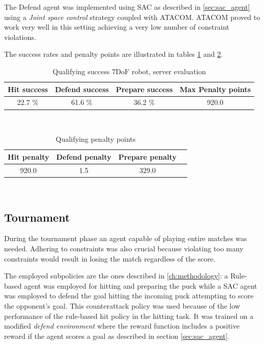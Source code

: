 The Defend agent was implemented using SAC as described in \ref{sec:sac_agent} using a \textit{Joint space control} strategy coupled with ATACOM. ATACOM proved
to work very well in this setting achieving a very low number of constraint violations.

The success rates and penalty points are illustrated in tables \ref{table:qualifying_success} and \ref{table:qualifying_penalties}.

\begin{table}[H]
    \centering 
    \begin{tabular}{|c | c | c | c |}
    \hline
     \textbf{Hit success} & \textbf{Defend success} & \textbf{Prepare success} & \textbf{Max Penalty points} \T\B \\
    \hline \hline
    22.7 \% & 61.6 \% & 36.2 \% & 920.0 \T\B \\
    \hline
    \end{tabular}
    \\[10pt]
    \caption{Qualifying success 7DoF robot, server evaluation}
    \label{table:qualifying_success}
\end{table}

\begin{table}[H]
    \centering 
    \begin{tabular}{|c | c | c | c |}
    \hline
     \textbf{Hit penalty} & \textbf{Defend penalty} & \textbf{Prepare penalty} \T\B \\
    \hline \hline
    920.0 & 1.5 & 329.0 \T\B \\
    \hline
    \end{tabular}
    \\[10pt]
    \caption{Qualifying penalty points}
    \label{table:qualifying_penalties}
\end{table}

\subsection{Tournament}
During the tournament phase an agent capable of playing entire matches was needed.
Adhering to constraints was also crucial because violating too many constraints would result in losing the match regardless of the score.

The employed subpolicies are the ones described in \ref{ch:methodology}: a Rule-based agent was employed for hitting and preparing the puck while
a SAC agent was employed to defend the goal hitting the incoming puck attempting to score the opponent's goal. This counterattack policy was used
because of the low performance of the rule-based hit policy in the hitting task. It was trained on a modified \textit{defend environment} where the reward function
includes a positive reward if the agent scores a goal as described in section \ref{sec:sac_agent}.

